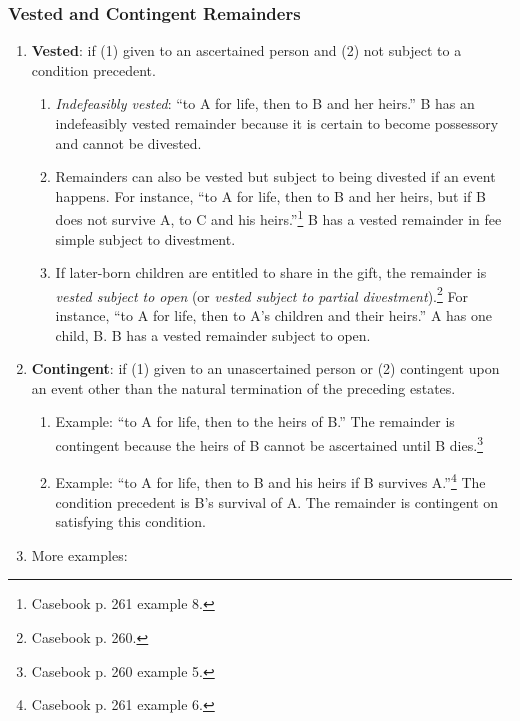 \subsubsection{Vested and Contingent Remainders}

\begin{enumerate}
    \item \textbf{Vested}: if (1) given to an ascertained person and (2) not 
    subject to a condition precedent.
    \begin{enumerate}
        \item \emph{Indefeasibly vested}:  ``to A for life, then to B and her 
        heirs.'' B has an indefeasibly vested remainder because it is certain 
        to become possessory and cannot be divested.
        \item Remainders can also be vested but subject to being divested if 
        an event happens. For instance, ``to A for life, then to B and her 
        heirs, but if B does not survive A, to C and his 
        heirs.''\footnote{Casebook p. 261 example 8.} B has a vested remainder 
        in fee simple subject to divestment.
        \item If later-born children are entitled to share in the gift, the 
        remainder is \emph{vested subject to open} (or \emph{vested subject to 
        partial divestment}).\footnote{Casebook p. 260.} For instance, ``to A 
        for life, then to A's children and their heirs.'' A has one child, B. 
        B has a vested remainder subject to open.
    \end{enumerate}
    \item \textbf{Contingent}: if (1) given to an unascertained person or (2) 
    contingent upon an event other than the natural termination of the 
    preceding estates.
    \begin{enumerate}
        \item Example: ``to A for life, then to the heirs of B.'' The 
        remainder is contingent because the heirs of B cannot be ascertained 
        until B dies.\footnote{Casebook p. 260 example 5.}
        \item Example: ``to A for life, then to B and his heirs if B survives 
        A.''\footnote{Casebook p. 261 example 6.} The condition precedent is 
        B's survival of A. The remainder is contingent on satisfying this 
        condition.
    \end{enumerate}
    \item More examples:
    \begin{enumerate}

\end{enumerate}
\end{enumerate}
